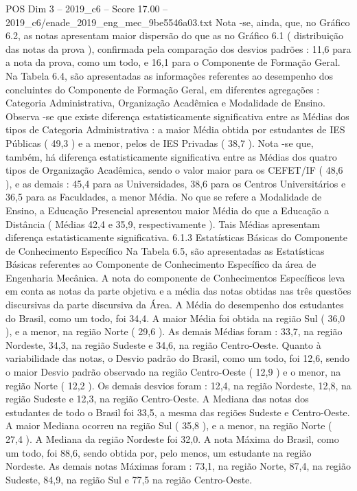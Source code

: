\begin{textsample}{POS Dim 3 – 2019\_c6 – Score 17.00 – 2019\_c6/enade\_2019\_eng\_mec\_9be5546a03.txt}
Nota -se, ainda, que, no Gráfico 6.2, as notas apresentam maior dispersão do que as no Gráfico 6.1 ( distribuição das notas da prova ), confirmada pela comparação dos desvios padrões : 11,6 para a nota da prova, como um todo, e 16,1 para o Componente de Formação Geral.
Na Tabela 6.4, são apresentadas as informações referentes ao desempenho dos concluintes do Componente de Formação Geral, em diferentes agregações : Categoria Administrativa, Organização Acadêmica e Modalidade de Ensino.
Observa -se que existe diferença estatisticamente significativa entre as Médias dos tipos de Categoria Administrativa : a maior Média obtida por estudantes de IES Públicas ( 49,3 ) e a menor, pelos de IES Privadas ( 38,7 ).
Nota -se que, também, há diferença estatisticamente significativa entre as Médias dos quatro tipos de Organização Acadêmica, sendo o valor maior para os CEFET/IF ( 48,6 ), e as demais : 45,4 para as Universidades, 38,6 para os Centros Universitários e 36,5 para as Faculdades, a menor Média.
No que se refere a Modalidade de Ensino, a Educação Presencial apresentou maior Média do que a Educação a Distância ( Médias 42,4 e 35,9, respectivamente ).
Tais Médias apresentam diferença estatisticamente significativa. 6.1.3 Estatísticas Básicas do Componente de Conhecimento Específico Na Tabela 6.5, são apresentadas as Estatísticas Básicas referentes ao Componente de Conhecimento Específico da área de Engenharia Mecânica.
A nota do componente de Conhecimentos Específicos leva em conta as notas da parte objetiva e a média das notas obtidas nas três questões discursivas da parte discursiva da Área.
A Média do desempenho dos estudantes do Brasil, como um todo, foi 34,4.
A maior Média foi obtida na região Sul ( 36,0 ), e a menor, na região Norte ( 29,6 ).
As demais Médias foram : 33,7, na região Nordeste, 34,3, na região Sudeste e 34,6, na região Centro-Oeste.
Quanto à variabilidade das notas, o Desvio padrão do Brasil, como um todo, foi 12,6, sendo o maior Desvio padrão observado na região Centro-Oeste ( 12,9 ) e o menor, na região Norte ( 12,2 ).
Os demais desvios foram : 12,4, na região Nordeste, 12,8, na região Sudeste e 12,3, na região Centro-Oeste.
A Mediana das notas dos estudantes de todo o Brasil foi 33,5, a mesma das regiões Sudeste e Centro-Oeste.
A maior Mediana ocorreu na região Sul ( 35,8 ), e a menor, na região Norte ( 27,4 ).
A Mediana da região Nordeste foi 32,0.
A nota Máxima do Brasil, como um todo, foi 88,6, sendo obtida por, pelo menos, um estudante na região Nordeste.
As demais notas Máximas foram : 73,1, na região Norte, 87,4, na região Sudeste, 84,9, na região Sul e 77,5 na região Centro-Oeste.

\end{textsample}
